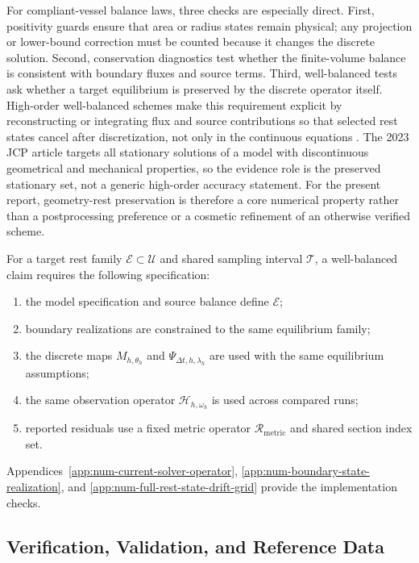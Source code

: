 For compliant-vessel balance laws, three checks are especially direct. First,
positivity guards ensure that area or radius states remain physical; any
projection or lower-bound correction must be counted because it changes the
discrete solution.
Second, conservation diagnostics test whether the finite-volume balance is
consistent with boundary fluxes and source terms. Third, well-balanced tests
ask whether a target equilibrium is preserved by the discrete operator itself.
High-order well-balanced schemes make this requirement explicit by reconstructing
or integrating flux and source contributions so that selected rest states cancel
after discretization, not only in the continuous equations
\cite{PimentelGarciaEtAl2023HighOrderWellBalanced}. The 2023 JCP article
targets all stationary solutions of a model with discontinuous geometrical and
mechanical properties, so the evidence role is the preserved stationary set, not
a generic high-order accuracy statement. For the present report, geometry-rest
preservation is therefore a core numerical property rather than a postprocessing
preference or a cosmetic refinement of an otherwise verified scheme.

\begin{definition}
\label{def:well-balanced-checklist}
For a target rest family $\mathcal E\subset\mathcal U$ and shared sampling
interval $\mathcal T$, a well-balanced claim requires the following
specification:
\begin{enumerate}
    \item the model specification and source balance define $\mathcal E$;
    \item boundary realizations are constrained to the same equilibrium family;
    \item the discrete maps $M_{h,\theta_h}$ and $\Psi_{\Delta t,h,\lambda_h}$
        are used with the same equilibrium assumptions;
    \item the same observation operator $\mathcal H_{h,\omega_h}$ is used across
        compared runs;
    \item reported residuals use a fixed metric operator
        $\mathcal R_{\mathrm{metric}}$ and shared section index set.
\end{enumerate}
Appendices~\ref{app:num-current-solver-operator},
\ref{app:num-boundary-state-realization}, and
\ref{app:num-full-rest-state-drift-grid} provide the implementation checks.
\end{definition}

\subsection{Verification, Validation, and Reference Data}
\label{subsec:numerical-methods-verification-validation}

